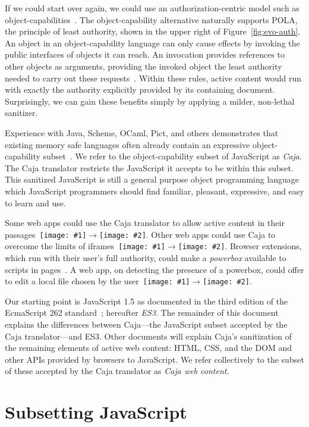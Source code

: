 \documentclass[letterpaper,twocolumn,10pt]{article}
\newcommand{\qq}[2]{{\texttt{[image: \#1]}}$\rightarrow${\texttt{[image: \#2]}}}
\begin{document}
If we could start over again, we could use an authorization-centric model 
such as object-capabilities~\cite{DVH}. The object-capability alternative 
naturally supports POLA, the principle of least authority, shown in the upper 
right of Figure~\ref{fig:evo-auth}. An object in an object-capability 
language can only cause effects by invoking the public interfaces of objects 
it can reach. An invocation provides references to other objects as 
arguments, providing the invoked object the least authority needed to carry 
out these requests~\cite{RobustComposition}. Within these rules, active 
content would run with exactly the authority explicitly provided by its 
containing document. Surprisingly, we can gain these benefits simply by 
applying a milder, non-lethal sanitizer.

Experience with Java, Scheme, OCaml, Pict, and others demonstrates that 
existing memory safe languages often already contain an expressive 
object-capability subset~\cite[respectively]{joe-e, rees96security, emily, 
backwater}. We refer to the object-capability subset of JavaScript as 
\emph{Caja}. The Caja translator restricts the JavaScript it accepts to be 
within this subset. This sanitized JavaScript is still a general purpose 
object programming language which JavaScript programmers should find 
familiar, pleasant, expressive, and easy to learn and use.

Some web apps could use the Caja translator to allow active content in their 
passages~\qq{1}{5}. Other web apps could use Caja to overcome the limits of 
iframes~\qq{3}{5}. Browser extensions, which run with their user's full 
authority, could make a \emph{powerbox} available to scripts in 
pages~\cite{darpareview, stiegler:polaris, seaborn:plash, bitfrost}. A web 
app, on detecting the presence of a powerbox, could offer to edit a local 
file chosen by the user~\qq{4}{6}.

Our starting point is JavaScript 1.5 as documented in the third edition of 
the EcmaScript 262 standard~\cite{ECMA-262}; hereafter \emph{ES3}. The 
remainder of this document explains the differences between Caja---the 
JavaScript subset accepted by the Caja translator---and ES3. Other documents 
will explain Caja's sanitization of the remaining elements of active web 
content: HTML, CSS, and the DOM and other APIs provided by browsers to 
JavaScript. We refer collectively to the subset of these accepted by the 
Caja translator as \emph{Caja web content}.


\section{Subsetting JavaScript}
\label{sec:subset}
\end{document}
